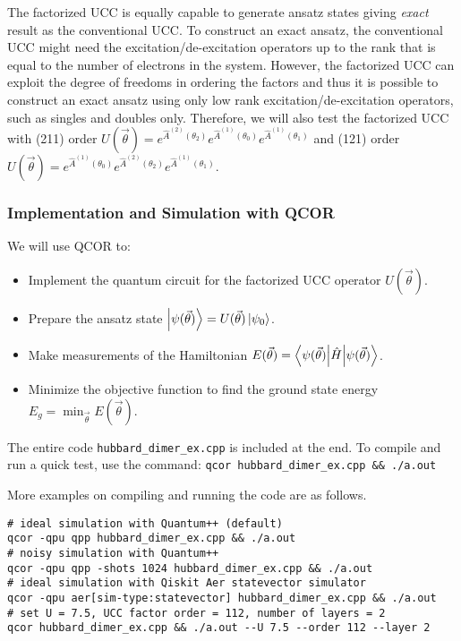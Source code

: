 The factorized UCC is equally capable to generate ansatz states giving \emph{exact} result as the conventional UCC. To construct an exact ansatz, the conventional UCC might need the excitation/de-excitation operators up to the rank that is equal to the number of electrons in the system. However, the factorized UCC can exploit the degree of freedoms in ordering the factors and thus it is possible to construct an exact ansatz using only low rank excitation/de-excitation operators, such as singles and doubles only. Therefore, we will also test the factorized UCC with (211) order $U(\vec{\theta}) = e^{\hat{A}^{(2)}(\theta_2)} e^{\hat{A}^{(1)}(\theta_0)} e^{\hat{A}^{(1)}(\theta_1)}$ and (121) order $U(\vec{\theta}) = e^{\hat{A}^{(1)}(\theta_0)} e^{\hat{A}^{(2)}(\theta_2)} e^{\hat{A}^{(1)}(\theta_1)}$.


\subsubsection*{Implementation and Simulation with QCOR}
We will use QCOR to:
\begin{itemize}[topsep=0pt,itemsep=0pt,partopsep=0pt, parsep=0pt]
\item Implement the quantum circuit for the factorized UCC operator $U(\vec{\theta})$.
\item Prepare the ansatz state $\left\vert{\psi(\vec{\theta})}\right\rangle = U(\vec{\theta})\left\vert{\psi_0}\right\rangle$.
\item Make measurements of the Hamiltonian $E(\vec{\theta}) = \left\langle{\psi(\vec{\theta})}\middle\vert{\hat{H}}\middle\vert{\psi(\vec{\theta})}\right\rangle$.
\item Minimize the objective function to find the ground state energy $E_g = \min_{\vec{\theta}} E(\vec{\theta})$.
\end{itemize}
The entire code \texttt{hubbard_dimer_ex.cpp} is included at the end. To compile and run a quick test, use the command:
\texttt{qcor hubbard_dimer_ex.cpp && ./a.out}

More examples on compiling and running the code are as follows.\\[-0.5cm]
\begin{verbatim}
# ideal simulation with Quantum++ (default)
qcor -qpu qpp hubbard_dimer_ex.cpp && ./a.out
# noisy simulation with Quantum++
qcor -qpu qpp -shots 1024 hubbard_dimer_ex.cpp && ./a.out
# ideal simulation with Qiskit Aer statevector simulator
qcor -qpu aer[sim-type:statevector] hubbard_dimer_ex.cpp && ./a.out
# set U = 7.5, UCC factor order = 112, number of layers = 2
qcor hubbard_dimer_ex.cpp && ./a.out --U 7.5 --order 112 --layer 2
\end{verbatim}

